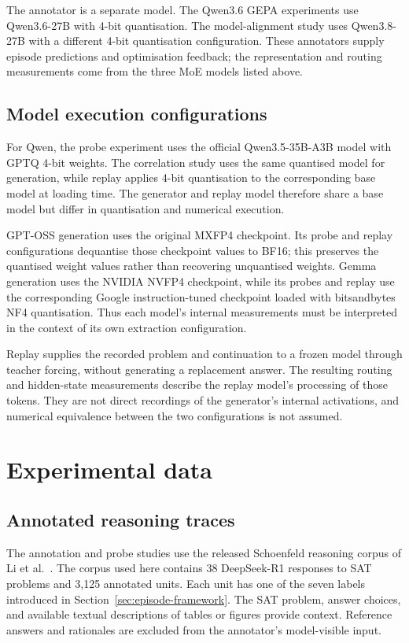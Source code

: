 \documentclass[12pt,a4paper,twoside,openright]{book}
\begin{document}
The annotator is a separate model. The Qwen3.6 GEPA experiments use
Qwen3.6-27B with 4-bit quantisation. The model-alignment study uses
Qwen3.8-27B with a different 4-bit quantisation configuration. These
annotators supply episode predictions and optimisation feedback; the
representation and routing measurements come from the three MoE models
listed above.

\subsection{Model execution configurations}

For Qwen, the probe experiment uses the official Qwen3.5-35B-A3B model with
GPTQ 4-bit weights. The correlation study uses the same quantised model for
generation, while replay applies 4-bit quantisation to the corresponding
base model at loading time. The generator and replay model therefore share
a base model but differ in quantisation and numerical execution.

GPT-OSS generation uses the original MXFP4 checkpoint. Its probe and replay
configurations dequantise those checkpoint values to BF16; this preserves
the quantised weight values rather than recovering unquantised weights.
Gemma generation uses the NVIDIA NVFP4 checkpoint, while its probes and
replay use the corresponding Google instruction-tuned checkpoint loaded
with bitsandbytes NF4 quantisation. Thus each model's internal measurements
must be interpreted in the context of its own extraction configuration.

Replay supplies the recorded problem and continuation to a frozen model
through teacher forcing, without generating a replacement answer. The
resulting routing and hidden-state measurements describe the replay model's
processing of those tokens. They are not direct recordings of the generator's
internal activations, and numerical equivalence between the two
configurations is not assumed.

\section{Experimental data}
\label{sec:setup-data}

\subsection{Annotated reasoning traces}

The annotation and probe studies use the released Schoenfeld reasoning corpus
of Li et al.~\cite{li2025schoenfeld}. The corpus used here contains
38 DeepSeek-R1 responses to SAT problems and 3,125 annotated units. Each unit
has one of the seven labels introduced in
Section~\ref{sec:episode-framework}. The SAT problem, answer choices, and
available textual descriptions of tables or figures provide context.
Reference answers and rationales are excluded from the annotator's
model-visible input.
\end{document}
